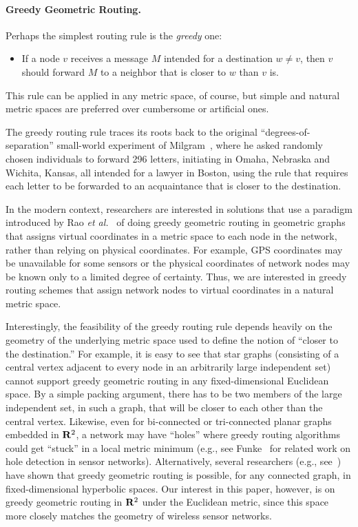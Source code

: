 \documentclass[11pt]{article}
\newcommand{\R}{{\bf R}}
\renewcommand{\subsection}[1]{\paragraph{#1.}}
\begin{document}
\subsection{Greedy Geometric Routing}
Perhaps the simplest routing rule is the 
\emph{greedy} one:
\begin{itemize}
\item
If a node $v$ receives a message $M$ 
intended for a destination $w\not= v$, 
then $v$ should forward $M$ to a neighbor that is
closer to $w$ than $v$ is.
\end{itemize}
This rule can be applied in any metric space, of course, but simple
and natural metric spaces are preferred over cumbersome or artificial
ones.
\ifFull

The greedy routing rule traces its roots back to the original
``degrees-of-separation'' small-world experiment of 
Milgram~\cite{m-swp-67}, where he asked randomly chosen individuals 
to forward 296 letters, initiating in Omaha, Nebraska and Wichita, 
Kansas, all intended for a lawyer in Boston, using the rule that 
requires each letter to be forwarded to an acquaintance that is 
closer to the destination.

In the modern context, researchers are interested in solutions that
use a paradigm introduced by Rao {\it et al.}~\cite{rrpss-grli-03} of
doing greedy geometric routing in geometric graphs that
assigns virtual coordinates in a metric space
to each node in the network, rather
than relying on physical coordinates.
For example, GPS coordinates 
may be unavailable for some sensors or the physical coordinates of
network nodes may be known only to a limited degree of certainty.
\fi
Thus, we are interested in greedy routing schemes that assign 
network nodes to virtual coordinates in a natural metric space.

\ifFull
Interestingly, the feasibility of the greedy routing
rule depends heavily on the geometry of the underlying metric space
used to define the notion of ``closer to the destination.''
For example, it is easy to see that star graphs (consisting
of a central vertex adjacent to every node in an arbitrarily large 
independent set)
cannot support greedy geometric routing in any 
fixed-dimensional Euclidean space. 
By a simple packing argument, there has to be two members of the
large independent set, in such a graph,
that will be closer to each other than the central
vertex.
Likewise, even for bi-connected or tri-connected planar graphs
embedded in $\R^2$, a
network may have ``holes'' where greedy routing
algorithms could get ``stuck'' in a local metric minimum
(e.g., see Funke~\cite{f-thdws-05} for
related work on hole detection in sensor networks).
Alternatively, several researchers (e.g.,
see~\cite{eg-sggdh-08,k-gruhs-07,m-adgra-07}) have shown that greedy
geometric routing is possible, for any connected graph,
in fixed-dimensional hyperbolic spaces.
Our interest in this paper, however, is on 
greedy geometric routing in $\R^2$ under the Euclidean metric,
since this space more closely matches the geometry of 
wireless sensor networks.
\fi
\end{document}
